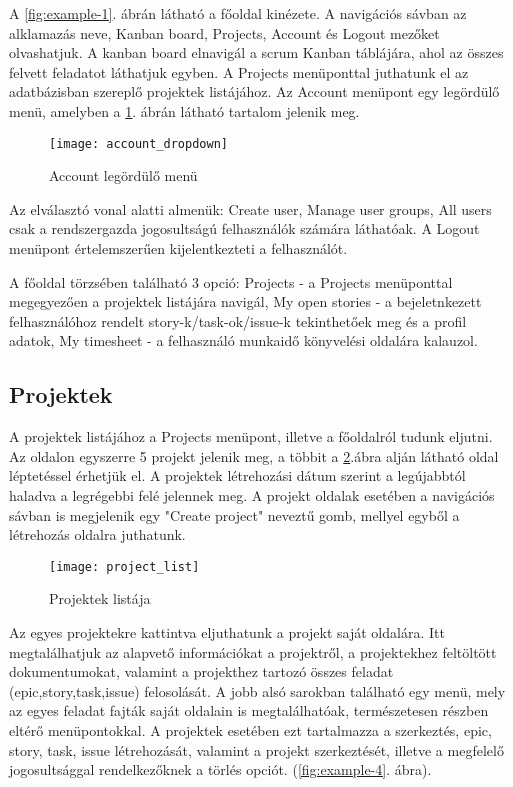 A \ref{fig:example-1}. ábrán látható a főoldal kinézete. A navigációs sávban az alklamazás neve, Kanban board, Projects, Account és Logout mezőket olvashatjuk. A kanban board elnavigál a scrum Kanban táblájára, ahol az összes felvett feladatot láthatjuk egyben. A Projects menüponttal juthatunk el az adatbázisban szereplő projektek listájához. Az Account menüpont egy legördülő menü, amelyben a \ref{fig:example-2}. ábrán látható tartalom jelenik meg.

\begin{figure}[H]
	\centering
	\texttt{[image: account\_dropdown]}
	\caption{Account legördülő menü}
	\label{fig:example-2}
\end{figure}

Az elválasztó vonal alatti almenük: Create user,  Manage user groups, All users csak a rendszergazda jogosultságú felhasználók számára láthatóak. A Logout menüpont értelemszerűen kijelentkezteti a felhasználót.

A főoldal törzsében található 3 opció: Projects - a Projects menüponttal megegyezően a projektek listájára navigál, My open stories - a bejeletnkezett felhasználóhoz rendelt story-k/task-ok/issue-k tekinthetőek meg és a profil adatok, My timesheet - a felhasználó munkaidő könyvelési oldalára kalauzol.

\subsection{Projektek}
\label{projects}

A projektek listájához a Projects menüpont, illetve a főoldalról tudunk eljutni. Az oldalon egyszerre 5 projekt jelenik meg, a többit a \ref{fig:example-3}.ábra alján látható oldal léptetéssel érhetjük el. A projektek létrehozási dátum szerint a legújabbtól haladva a legrégebbi felé jelennek meg. A projekt oldalak esetében a navigációs sávban is megjelenik egy "Create project" neveztű gomb, mellyel egyből a létrehozás oldalra juthatunk.

\begin{figure}[H]
	\centering
	\texttt{[image: project\_list]}
	\caption{Projektek listája}
	\label{fig:example-3}
\end{figure}

Az egyes projektekre kattintva eljuthatunk a projekt saját oldalára. Itt megtalálhatjuk az alapvető információkat a projektről, a projektekhez feltöltött dokumentumokat, valamint a projekthez tartozó összes feladat (epic,story,task,issue) felosolását. A jobb alsó sarokban található egy menü, mely az egyes feladat fajták saját oldalain is megtalálhatóak, természetesen részben eltérő menüpontokkal. A projektek esetében ezt tartalmazza a szerkeztés, epic, story, task, issue létrehozását, valamint a projekt szerkeztését, illetve a megfelelő jogosultsággal rendelkezőknek a törlés opciót. (\ref{fig:example-4}. ábra).

